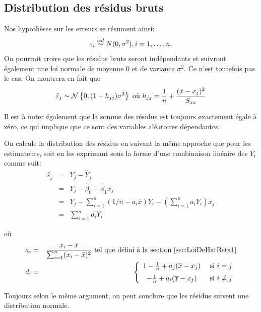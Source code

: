 \subsection{Distribution des résidus bruts}
\label{sec:DistributionDesRésidus}

Nos hypothèses sur les erreurs se résument ainsi:
$$\varepsilon_i \overset{iid}{\sim} N(0,\sigma^2), i = 1,\ldots, n.$$
On pourrait croire que les résidus bruts seront indépendants et suivront également une loi normale de moyenne $0$ et de variance $\sigma^2$. Ce n'est toutefois pas le cas. On montrera en fait que
\begin{equation}
\label{eq:loiresidus}
\hat{\varepsilon}_j \sim \mathcal{N} \left\{0, (1-h_{jj})\sigma^2\right\} \mbox{ où } h_{jj}=\frac{1}{n}+\frac{(\bar x-x_j)^2}{S_{xx}}
\end{equation}

Il est à noter également que la somme des résidus est toujours exactement égale à zéro, ce qui implique que ce sont des variables aléatoires dépendantes.

On calcule la distribution des résidus en suivant la même approche que pour les estimateurs, soit en les exprimant sous la forme d'une combinaison linéaire des $Y_i$ comme suit:
\begin{eqnarray*}
 \hat{\varepsilon}_j &=& Y_j - \hat{Y}_j\\
 &=& Y_j - \hat{\beta}_0 - \hat{\beta}_1 x_j\\
 &=& Y_j - \sum_{i=1}^n (1/n - a_i \overline{x}) Y_i - \left(\sum_{i=1}^n a_i Y_i\right) x_j \\
 &=& \sum_{i=1}^n d_i Y_i
\end{eqnarray*}

où
\begin{eqnarray*}
a_i &= & \frac{x_i-\bar x}{\sum_{i=1}^n(x_i-\bar x)^2} \mbox{ tel que défini à la section \ref{sec:LoiDeHatBeta1}}\\
d_i & = & \left\{
 \begin{array}{cc}
 1-\frac{1}{n} + a_j (\overline{x}-x_j) & \mbox{ si } i=j \vspace*{2 mm}\\
     -\frac{1}{n} + a_i (\overline{x}-x_j) & \mbox{ si } i\neq j
     \end{array}
     \right.
\end{eqnarray*}

Toujours selon le même argument, on peut conclure que les résidus suivent une distribution normale.

